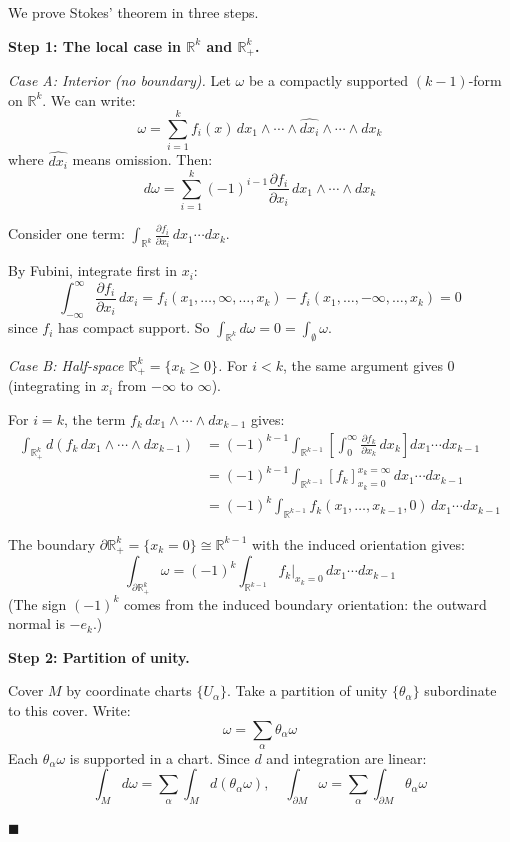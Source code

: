 \documentclass[11pt, letterpaper, openany]{book}
\renewenvironment{proof}[1][\proofname]{%
  \tcolorbox[blanker, breakable, left=1em,
    before skip=1em, after skip=1em,
    borderline west={2pt}{0pt}{MagicTeal!50},
    colback=MagicCream,
    before upper={\textcolor{MagicTeal}{\sffamily\bfseries #1.}\space}
  ]%
}{%
  \hfill\textcolor{MagicTeal}{\ensuremath{\blacksquare}}\endtcolorbox%
}
\begin{document}
\begin{proof}
We prove Stokes' theorem in three steps.

\textbf{Step 1: The local case in $\mathbb{R}^k$ and $\mathbb{R}^k_+$.}

\textit{Case A: Interior (no boundary).} Let $\omega$ be a compactly supported $(k-1)$-form on $\mathbb{R}^k$. We can write:
\[\omega = \sum_{i=1}^k f_i(x) \, dx_1 \wedge \cdots \wedge \widehat{dx_i} \wedge \cdots \wedge dx_k\]
where $\widehat{dx_i}$ means omission. Then:
\[d\omega = \sum_{i=1}^k (-1)^{i-1} \frac{\partial f_i}{\partial x_i} \, dx_1 \wedge \cdots \wedge dx_k\]

Consider one term: $\int_{\mathbb{R}^k} \frac{\partial f_i}{\partial x_i} \, dx_1 \cdots dx_k$.

By Fubini, integrate first in $x_i$:
\[\int_{-\infty}^\infty \frac{\partial f_i}{\partial x_i} \, dx_i = f_i(x_1, \ldots, \infty, \ldots, x_k) - f_i(x_1, \ldots, -\infty, \ldots, x_k) = 0\]
since $f_i$ has compact support. So $\int_{\mathbb{R}^k} d\omega = 0 = \int_{\emptyset} \omega$.

\textit{Case B: Half-space $\mathbb{R}^k_+ = \{x_k \geq 0\}$.} For $i < k$, the same argument gives 0 (integrating in $x_i$ from $-\infty$ to $\infty$).

For $i = k$, the term $f_k \, dx_1 \wedge \cdots \wedge dx_{k-1}$ gives:
\begin{align*}
\int_{\mathbb{R}^k_+} d(f_k \, dx_1 \wedge \cdots \wedge dx_{k-1}) &= (-1)^{k-1} \int_{\mathbb{R}^{k-1}} \left[ \int_0^\infty \frac{\partial f_k}{\partial x_k} \, dx_k \right] dx_1 \cdots dx_{k-1} \\
&= (-1)^{k-1} \int_{\mathbb{R}^{k-1}} [f_k]_{x_k=0}^{x_k=\infty} \, dx_1 \cdots dx_{k-1} \\
&= (-1)^k \int_{\mathbb{R}^{k-1}} f_k(x_1, \ldots, x_{k-1}, 0) \, dx_1 \cdots dx_{k-1}
\end{align*}

The boundary $\partial \mathbb{R}^k_+ = \{x_k = 0\} \cong \mathbb{R}^{k-1}$ with the induced orientation gives:
\[\int_{\partial \mathbb{R}^k_+} \omega = (-1)^k \int_{\mathbb{R}^{k-1}} f_k|_{x_k=0} \, dx_1 \cdots dx_{k-1}\]
(The sign $(-1)^k$ comes from the induced boundary orientation: the outward normal is $-e_k$.)

\textbf{Step 2: Partition of unity.}

Cover $M$ by coordinate charts $\{U_\alpha\}$. Take a partition of unity $\{\theta_\alpha\}$ subordinate to this cover. Write:
\[\omega = \sum_\alpha \theta_\alpha \omega\]
Each $\theta_\alpha \omega$ is supported in a chart. Since $d$ and integration are linear:
\[\int_M d\omega = \sum_\alpha \int_M d(\theta_\alpha \omega), \quad \int_{\partial M} \omega = \sum_\alpha \int_{\partial M} \theta_\alpha \omega\]


\end{proof}
\end{document}
